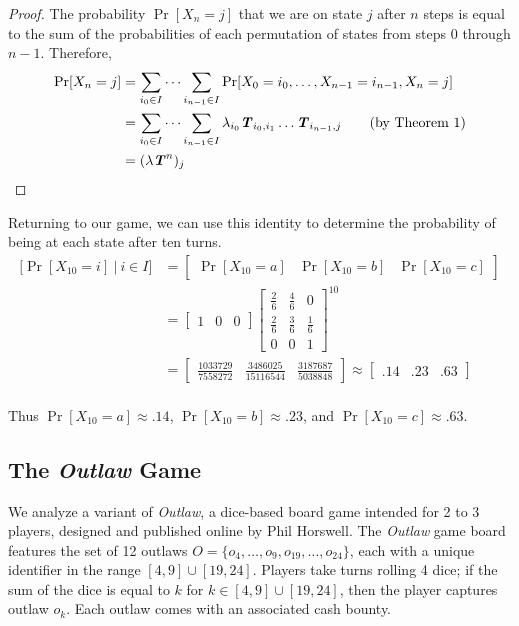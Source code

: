 \documentclass{article}
\newcommand{\T}{\textbf{\textit{T}}}
\theoremstyle{definition}
\theoremstyle{plain}
\begin{document}
	\begin{proof}
	The probability $\Pr[X_n = j]$ that we are on state $j$ after $n$ steps is equal to the sum of the probabilities of each permutation of states from steps $0$ through $n-1$. Therefore,
	\begin{align*}
	\Pr[X_n = j] &= \sum_{i_0 \in I} \dots \sum_{i_{n-1} \in I} \Pr[X_0 = i_0, \dots, X_{n-1} = i_{n-1}, X_n = j]\\
	&= \sum_{i_0 \in I} \dots \sum_{i_{n-1} \in I} \lambda_{i_0}\T_{i_0, i_1}\dots\T_{i_{n-1}, j} \tag{by Theorem 1}\\
	&= (\lambda \T^n)_j
	\end{align*}
	\end{proof}
	
		Returning to our game, we can use this identity to determine the probability of being at each state after ten turns.
		\begin{align*}
		\Big[\Pr[X_{10} = i] ~|~ i \in I\Big] &= 
		\begin{bmatrix}
		\Pr[X_{10} = a] & \Pr[X_{10} = b] & \Pr[X_{10} = c]
		\end{bmatrix}\\ &=
		\begin{bmatrix}
		1 & 0 & 0
		\end{bmatrix}
		\begin{bmatrix}
			\frac{2}{6} & \frac{4}{6} & 0           \\
			\frac{2}{6} & \frac{3}{6} & \frac{1}{6} \\
			0           & 0			  & 1
		\end{bmatrix}
		^{10}\\
		&=	
		\begin{bmatrix}
		\frac{1033729}{7558272} & \frac{3486025}{15116544} & \frac{3187687}{5038848}
		\end{bmatrix}
		\approx \begin{bmatrix}
		.14 & .23 & .63
		\end{bmatrix}
		\end{align*}
	\\
	Thus $\Pr[X_{10} = a] \approx .14$, $\Pr[X_{10} = b] \approx .23$, and $\Pr[X_{10} = c] \approx .63$.
	
	\subsection{The \textit{Outlaw} Game}
	We analyze a variant of \textit{Outlaw}, a dice-based board game intended for 2 to 3 players, designed and published online by Phil Horswell. The \textit{Outlaw} game board features the set of 12 outlaws $O = \{o_4, \dots, o_{9}, o_{19}, \dots, o_{24}\}$, each with a unique identifier in the range $[4, 9] \cup [19, 24]$. Players take turns rolling 4 dice; if the sum of the dice is equal to $k$ for $k \in [4, 9] \cup [19, 24]$, then the player captures outlaw $o_k$. Each outlaw comes with an associated cash bounty.
	
\end{document}
